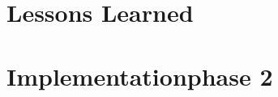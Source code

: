 \documentclass[english,oneside,color]{htldipl}
\begin{document}
\part{Lessons Learned}


\part{Implementationphase 2}

\clearpage
{}






\end{document}
